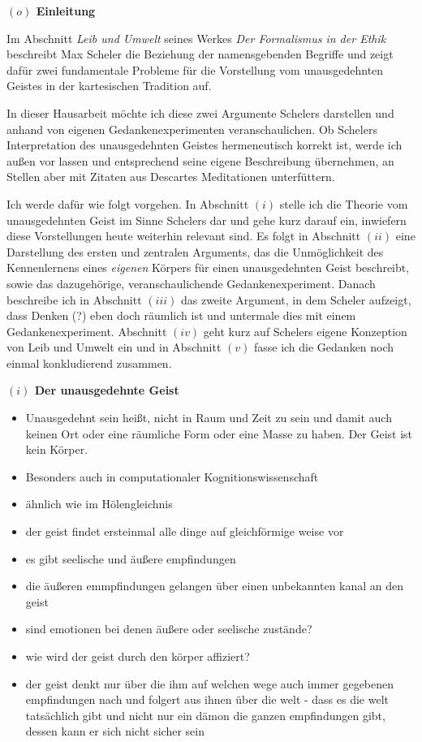 \documentclass[a4paper, 12pt]{article}
\begin{document}
\begin{onehalfspace} 

\noindent\textbf{$(o)$ Einleitung}

\noindent Im Abschnitt \emph{Leib und Umwelt} seines Werkes \emph{Der Formalismus in der Ethik} beschreibt Max Scheler die Beziehung der namensgebenden Begriffe und zeigt dafür zwei fundamentale Probleme für die Vorstellung vom unausgedehnten Geistes in der kartesischen Tradition auf.%

In dieser Hausarbeit möchte ich diese zwei Argumente Schelers darstellen und anhand von eigenen Gedankenexperimenten veranschaulichen. Ob Schelers Interpretation des unausgedehnten Geistes hermeneutisch korrekt ist, werde ich außen vor lassen und entsprechend seine eigene Beschreibung übernehmen, an Stellen aber mit Zitaten aus Descartes Meditationen unterfüttern. 

Ich werde dafür wie folgt vorgehen. In Abschnitt $(i)$ stelle ich die Theorie vom unausgedehnten Geist im Sinne Schelers dar und gehe kurz darauf ein, inwiefern diese Vorstellungen heute weiterhin relevant sind. Es folgt in Abschnitt $(ii)$ eine Darstellung des ersten und zentralen Arguments, das die Unmöglichkeit des Kennenlernens eines \emph{eigenen} Körpers für einen unausgedehnten Geist beschreibt, sowie das dazugehörige, veranschaulichende Gedankenexperiment. Danach beschreibe ich in Abschnitt $(iii)$ das zweite Argument, in dem Scheler aufzeigt, dass Denken (?) eben doch räumlich ist und untermale dies mit einem Gedankenexperiment. Abschnitt $(iv)$ geht kurz auf Schelers eigene Konzeption von Leib und Umwelt ein und in Abschnitt $(v)$ fasse ich die Gedanken noch einmal konkludierend zusammen.

\vspace{5mm}
\noindent\textbf{$(i)$ Der unausgedehnte Geist}

\begin{itemize}
  \item Unausgedehnt sein heißt, nicht in Raum und Zeit zu sein und damit auch keinen Ort oder eine räumliche Form oder eine Masse zu haben. Der Geist ist kein Körper.  
  \item Besonders auch in computationaler Kognitionswissenschaft 
  \item ähnlich wie im Hölengleichnis
  \item der geist findet ersteinmal alle dinge auf gleichförmige weise vor
  \item es gibt seelische und äußere empfindungen
  \item die äußeren emmpfindungen gelangen über einen unbekannten kanal an den geist
  \item sind emotionen bei denen äußere oder seelische zustände? 
  \item wie wird der geist durch den körper affiziert?
  \item der geist denkt nur über die ihm auf welchen wege auch immer gegebenen empfindungen nach und folgert aus ihnen über die welt - dass es die welt tatsächlich gibt und nicht nur ein dämon die ganzen empfindungen gibt, dessen kann er sich nicht sicher sein
\end{itemize}



\end{onehalfspace}
\end{document}
